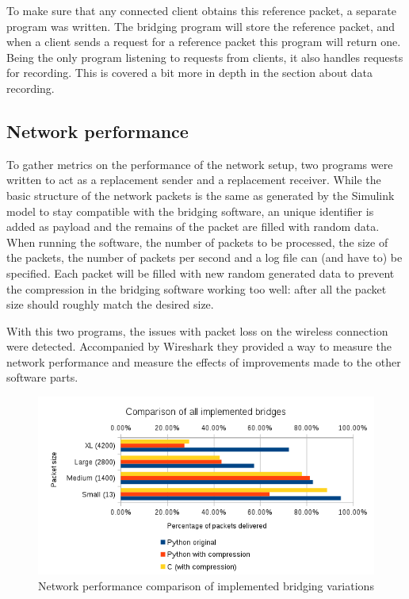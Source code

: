 To make sure that any connected client obtains this reference packet, a separate program was written. The bridging program will store the reference packet, and when a client sends a request for a reference packet this program will return one. Being the only program listening to requests from clients, it also handles requests for recording. This is covered a bit more in depth in the section about data recording.

\subsection{Network performance}

To gather metrics on the performance of the network setup, two programs were written to act as a replacement sender and a replacement receiver. While the basic structure of the network packets is the same as generated by the Simulink model to stay compatible with the bridging software, an unique identifier is added as payload and the remains of the packet are filled with random data. When running the software, the number of packets to be processed, the size of the packets, the number of packets per second and a log file can (and have to) be specified. Each packet will be filled with new random generated data to prevent the compression in the bridging software working too well: after all the packet size should roughly match the desired size.

With this two programs, the issues with packet loss on the wireless connection were detected. Accompanied by Wireshark they provided a way to measure the network performance and measure the effects of improvements made to the other software parts.

\begin{figure}[H]
	\centering
	\includegraphics[width=\linewidth]{images/overview.png}
	\caption{Network performance comparison of implemented bridging variations}
	\label{fig:networkperformance}
\end{figure}

